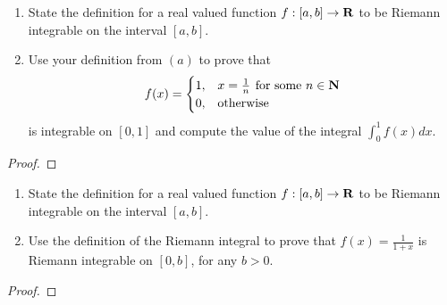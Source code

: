 \documentclass[11pt,twoside,openany]{memoir}
\begin{document}
\newpage
\fancyhead[L]{\scalebox{0.9}{Integration}}
\fancyhead[R]{\scalebox{0.9}{Appeared on: F17}}
\begin{problem}
    \phantom{a}
    \begin{enumerate}[label = (\arabic*)]
        \item State the definition for a real valued function $f:[a,b] \rightarrow \bfR$ to be Riemann integrable on the interval $[a,b]$.
        \item Use your definition from $(a)$ to prove that 
            \begin{equation*}
            \begin{split}
                f(x) = 
                \begin{cases}
                    1, & x = \frac{1}{n} \h4\text{for some $n \in \bfN$} \\
                    0, & \text{otherwise}
                \end{cases}
            \end{split}
            \end{equation*}
        is integrable on $[0,1]$ and compute the value of the integral $\int_0^1 f(x)dx$.
    \end{enumerate}
\end{problem}
\begin{proof}
\end{proof}

\newpage
\fancyhead[L]{\scalebox{0.9}{Integration}}
\fancyhead[R]{\scalebox{0.9}{Appeared on: S17}}
\begin{problem}
    \phantom{a}
    \begin{enumerate}[label = (\arabic*)]
        \item State the definition for a real valued function $f:[a,b] \rightarrow \bfR$ to be Riemann integrable on the interval $[a,b]$.
        \item Use the definition of the Riemann integral to prove that $f(x) = \frac{1}{1+x}$ is Riemann integrable on $[0,b]$, for any $b > 0$.
    \end{enumerate}
\end{problem}
\begin{proof}
\end{proof}
\end{document}
